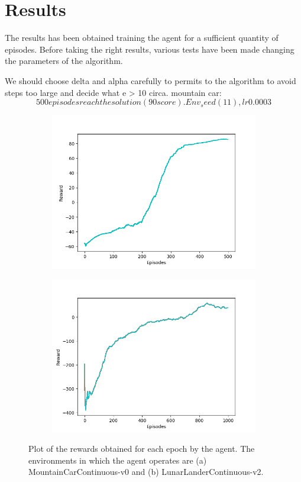 \documentclass[11pt]{article}
\begin{document}
\section{Results}
The results has been obtained training the agent for a sufficient quantity of episodes.
Before taking the right results, various tests have been made changing the parameters of
the algorithm.


       
We should choose delta and alpha carefully to permits to the algorithm to avoid steps too
large and decide what e > 10 circa. mountain car:
$$500 episodes reach the solution (90 score). Env_seed (11), lr 0.0003$$

\begin{figure}[h!]
        \centering
        \begin{subfigure}[b]{0.6\linewidth}
                \includegraphics[width=\linewidth]{mountain_plot}
                \caption{}
        \end{subfigure}
        \begin{subfigure}[b]{0.6\linewidth}
                \includegraphics[width=\linewidth]{lunar_plot}
                \caption{}
        \end{subfigure}

        \caption{ Plot of the rewards obtained for each epoch by the agent. The environments in which the agent operates are (a) MountainCarContinuous-v0 and (b) LunarLanderContinuous-v2.}
        \label{fig:plots}
\end{figure}
\end{document}

